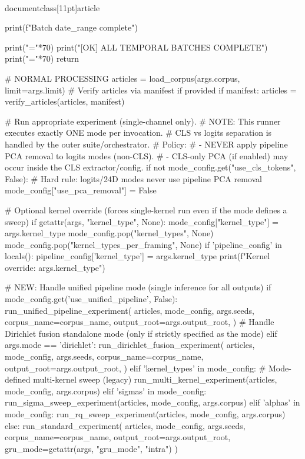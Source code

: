 \\documentclass[11pt]{article}
\begin{document}
\begin{CodeBlock}
            print(f"\n[OK] Batch {date_range} complete\n")
        
        print("="*70)
        print("[OK] ALL TEMPORAL BATCHES COMPLETE")
        print("="*70)
        return
    
    # NORMAL PROCESSING
    articles = load_corpus(args.corpus, limit=args.limit)
    # Verify articles via manifest if provided
    if manifest:
        articles = verify_articles(articles, manifest)

    # Run appropriate experiment (single-channel only).
    # NOTE: This runner executes exactly ONE mode per invocation.
    #       CLS vs logits separation is handled by the outer suite/orchestrator.
    # Policy:
    #   - NEVER apply pipeline PCA removal to logits modes (non-CLS).
    #   - CLS-only PCA (if enabled) may occur inside the CLS extractor/config.
    if not mode_config.get("use_cls_tokens", False):
        # Hard rule: logits/24D modes never use pipeline PCA removal
        mode_config["use_pca_removal"] = False

    # Optional kernel override (forces single-kernel run even if the mode defines a sweep)
    if getattr(args, "kernel_type", None):
        mode_config["kernel_type"] = args.kernel_type
        mode_config.pop("kernel_types", None)
        mode_config.pop("kernel_types_per_framing", None)
        if 'pipeline_config' in locals():
            pipeline_config['kernel_type'] = args.kernel_type
        print(f"Kernel override: {args.kernel_type}")

    # NEW: Handle unified pipeline mode (single inference for all outputs)
    if mode_config.get('use_unified_pipeline', False):
        run_unified_pipeline_experiment(
            articles,
            mode_config,
            args.seeds,
            corpus_name=corpus_name,
            output_root=args.output_root,
        )
    # Handle Dirichlet fusion standalone mode (only if strictly specified as the mode)
    elif args.mode == 'dirichlet':
        run_dirichlet_fusion_experiment(
            articles,
            mode_config,
            args.seeds,
            corpus_name=corpus_name,
            output_root=args.output_root,
        )
    elif 'kernel_types' in mode_config:
        # Mode-defined multi-kernel sweep (legacy)
        run_multi_kernel_experiment(articles, mode_config, args.corpus)
    elif 'sigmas' in mode_config:
        run_sigma_sweep_experiment(articles, mode_config, args.corpus)
    elif 'alphas' in mode_config:
        run_rq_sweep_experiment(articles, mode_config, args.corpus)
    else:
        run_standard_experiment(
            articles,
            mode_config,
            args.seeds,
            corpus_name=corpus_name,
            output_root=args.output_root,
            gru_mode=getattr(args, "gru_mode", "intra")
        )


\end{CodeBlock}
\end{document}
